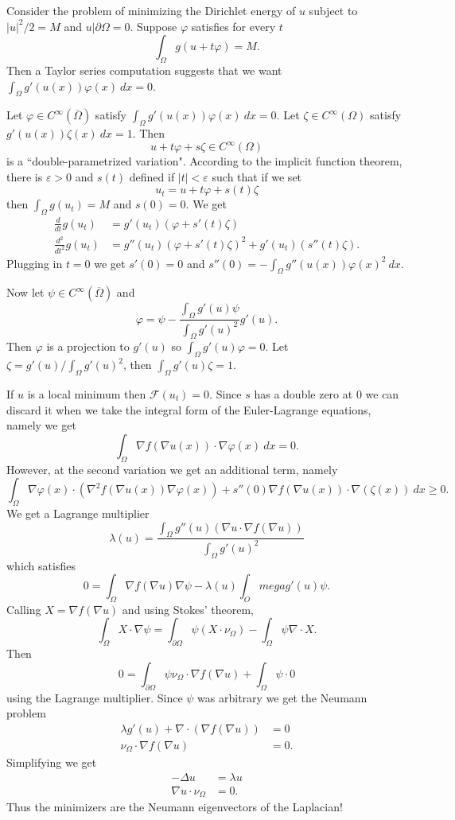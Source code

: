 \documentclass[12pt]{book}
\theoremstyle{definition}
\newenvironment{example}
  {\pushQED{\qed}\renewcommand{\qedsymbol}{$\diamondsuit$}\examplex}
  {\popQED\endexamplex}
\begin{document}
\begin{example}
Consider the problem of minimizing the Dirichlet energy of $u$ subject to $|u|^2/2 = M$ and $u|\partial \Omega = 0$.
Suppose $\varphi$ satisfies for every $t$
$$\int_\Omega g(u + t\varphi) = M.$$
Then a Taylor series computation suggests that we want $\int_\Omega g'(u(x))\varphi(x) ~dx = 0$.

Let $\varphi \in C^\infty(\overline \Omega)$ satisfy $\int_\Omega g'(u(x)) \varphi(x) ~dx = 0$.
Let $\zeta \in C^\infty(\Omega)$ satisfy $g'(u(x)) \zeta(x) ~dx = 1$.
Then
$$u + t\varphi + s\zeta \in C^\infty(\Omega)$$
is a ``double-parametrized variation".
According to the implicit function theorem, there is $\varepsilon > 0$ and $s(t)$ defined if $|t| < \varepsilon$ such that if we set
$$u_t = u + t\varphi + s(t)\zeta$$
then
$\int_\Omega g(u_t) = M$ and $s(0) = 0$.
We get
\begin{align*}
\frac{d}{dt} g(u_t) &= g'(u_t)(\varphi + s'(t)\zeta)\\
\frac{d^2}{dt^2} g(u_t) &= g''(u_t)(\varphi + s'(t)\zeta)^2 + g'(u_t)(s''(t)\zeta).
\end{align*}
Plugging in $t = 0$ we get $s'(0) = 0$ and $s''(0) = -\int_\Omega g''(u(x))\varphi(x)^2 ~dx$.

Now let $\psi \in C^\infty(\overline \Omega)$ and
$$\varphi = \psi - \frac{\int_\Omega g'(u)\psi}{\int_\Omega g'(u)^2}g'(u).$$
Then $\varphi$ is a projection to $g'(u)$ so $\int_\Omega g'(u)\varphi = 0$.
Let $\zeta = g'(u)/\int_\Omega g'(u)^2$, then $\int_\Omega g'(u)\zeta = 1$.

If $u$ is a local minimum then $\mathcal F(u_t) = 0$. Since $s$ has a double zero at $0$ we can discard it when we take the integral form of the Euler-Lagrange equations, namely we get
$$\int_\Omega \nabla f(\nabla u(x)) \cdot \nabla \varphi(x) ~dx = 0.$$
However, at the second variation we get an additional term, namely
$$\int_\Omega \nabla \varphi(x) \cdot (\nabla^2 f(\nabla u(x))\nabla\varphi(x)) + s''(0)\nabla f(\nabla u(x)) \cdot \nabla(\zeta(x)) ~dx \geq 0.$$
We get a Lagrange multiplier
$$\lambda(u) = \frac{\int_\Omega g''(u)(\nabla u \cdot \nabla f(\nabla u))}{\int_\Omega g'(u)^2}$$
which satisfies
$$0 = \int_\Omega \nabla f(\nabla u) \nabla \psi - \lambda(u)\int_Omega g'(u)\psi.$$
Calling $X = \nabla f(\nabla u)$ and using Stokes' theorem,
$$\int_\Omega X \cdot \nabla \psi = \int_{\partial \Omega} \psi(X \cdot \nu_\Omega) - \int_\Omega \psi \nabla \cdot X.$$
Then
$$0 = \int_{\partial \Omega} \psi \nu_\Omega \cdot \nabla f(\nabla u) + \int_\Omega \psi \cdot 0$$
using the Lagrange multiplier.
Since $\psi$ was arbitrary we get the Neumann problem
\begin{align*}
\lambda g'(u) + \nabla \cdot(\nabla f(\nabla u)) &= 0\\
\nu_\Omega \cdot \nabla f(\nabla u) &= 0.
\end{align*}
Simplifying we get
\begin{align*}
-\Delta u &= \lambda u\\
\nabla u \cdot \nu_\Omega &= 0.
\end{align*}
Thus the minimizers are the Neumann eigenvectors of the Laplacian!
\end{example}
\end{document}
